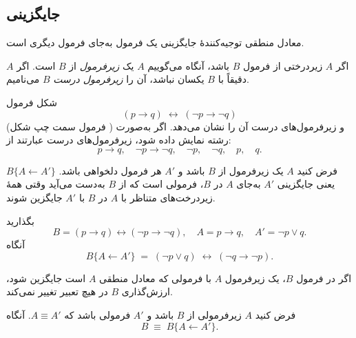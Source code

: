 \subsection*{ جایگزینی}
      معادل منطقی توجیه‌کنندهٔ جایگزینی یک فرمول به‌جای فرمول دیگری است.
      
      \begin{definition}[تعریف \lr{2.30}]
        اگر $A$ زیردرختی از فرمول $B$ باشد، آنگاه می‌گوییم $A$ یک \emph{زیرفرمول} از $B$ است. اگر $A$ دقیقاً با $B$ یکسان نباشد، آن را \emph{زیرفرمول درست} $B$ می‌نامیم.
      \end{definition}
      
      \begin{example}[مثال \lr{2.31}]
        شکل  فرمول
        \[
        (p \to q) \;\leftrightarrow\; (\neg p \to \neg q)
        \]
        (فرمول سمت چپ شکل ) و زیرفرمول‌های درست آن را نشان می‌دهد.
        اگر به‌صورت رشته نمایش داده شود، زیرفرمول‌های درست عبارتند از:
        \[
        p \to q,\quad \neg p \to \neg q,\quad \neg p,\quad \neg q,\quad p,\quad q.
        \]
      \end{example}
      
      \begin{definition}[تعریف \lr{2.32}]
        فرض کنید $A$ یک زیرفرمول از $B$ باشد و $A'$ هر فرمول دلخواهی باشد.
        $B\{A \leftarrow A'\}$ یعنی جایگزینی $A'$ به‌جای $A$ در $B$، فرمولی است که از $B$ به‌دست می‌آید وقتی همهٔ زیردرخت‌های متناظر با $A$ در $B$ با $A'$ جایگزین شوند.
      \end{definition}
      
      \begin{example}[مثال \lr{2.33}]
        بگذارید
        \[
        B = (p \to q) \leftrightarrow (\neg p \to \neg q),\quad
        A = p \to q,\quad
        A' = \neg p \lor q.
        \]
        آنگاه
        \[
        B\{A \leftarrow A'\}
        \;=\;
        (\neg p \lor q) \;\leftrightarrow\; (\neg q \to \neg p).
        \]
      \end{example}
      
      اگر در فرمول $B$، یک زیرفرمول $A$ با فرمولی که معادل منطقی $A$ است جایگزین شود، ارزش‌گذاری $B$ در هیچ تعبیر تغییر نمی‌کند.
      
      \begin{theorem}[قضیه \lr{2.34}]
        فرض کنید $A$ زیرفرمولی از $B$ باشد و $A'$ فرمولی باشد که $A \equiv A'$. آنگاه
        \[
        B \;\equiv\; B\{A \leftarrow A'\}.
        \]
      \end{theorem}
      
